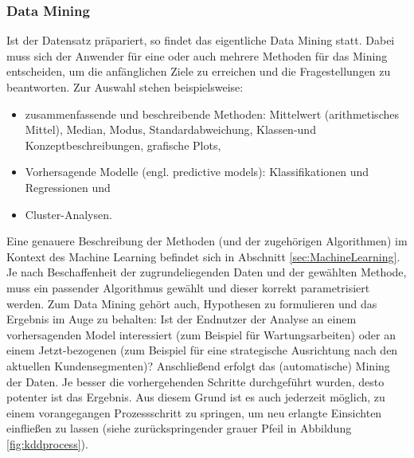 \subsubsection{Data Mining}\label{subsubsec:DataMining}
Ist der Datensatz präpariert, so findet das eigentliche Data Mining statt. Dabei muss sich der Anwender für eine oder auch mehrere Methoden für das Mining entscheiden, um die anfänglichen Ziele zu erreichen und die Fragestellungen zu beantworten. Zur Auswahl stehen beispielsweise:
\begin{itemize}
\item zusammenfassende und beschreibende Methoden: Mittelwert (arithmetisches Mittel), Median, Modus, Standardabweichung, Klassen-und Konzeptbeschreibungen, grafische Plots,
\item Vorhersagende Modelle (engl. predictive models): Klassifikationen und Regressionen und
\item Cluster-Analysen.
\end{itemize}
Eine genauere Beschreibung der Methoden (und der zugehörigen Algorithmen) im Kontext des Machine Learning befindet sich in Abschnitt \ref{sec:MachineLearning}. Je nach Beschaffenheit der zugrundeliegenden Daten und der gewählten Methode, muss ein passender Algorithmus gewählt und dieser korrekt parametrisiert werden. Zum Data Mining gehört auch, Hypothesen zu formulieren und das Ergebnis im Auge zu behalten: Ist der Endnutzer der Analyse an einem vorhersagenden Model interessiert (zum Beispiel für Wartungsarbeiten) oder an einem Jetzt-bezogenen (zum Beispiel für eine strategische Ausrichtung nach den aktuellen Kundensegmenten)?\newline
Anschließend erfolgt das (automatische) Mining der Daten. Je besser die vorhergehenden Schritte durchgeführt wurden, desto potenter ist das Ergebnis.\citep[S.~42]{fayyad_data_1996} Aus diesem Grund ist es auch jederzeit möglich, zu einem vorangegangen Prozessschritt zu springen, um neu erlangte Einsichten einfließen zu lassen (siehe zurückspringender grauer Pfeil in Abbildung \ref{fig:kddprocess}).

